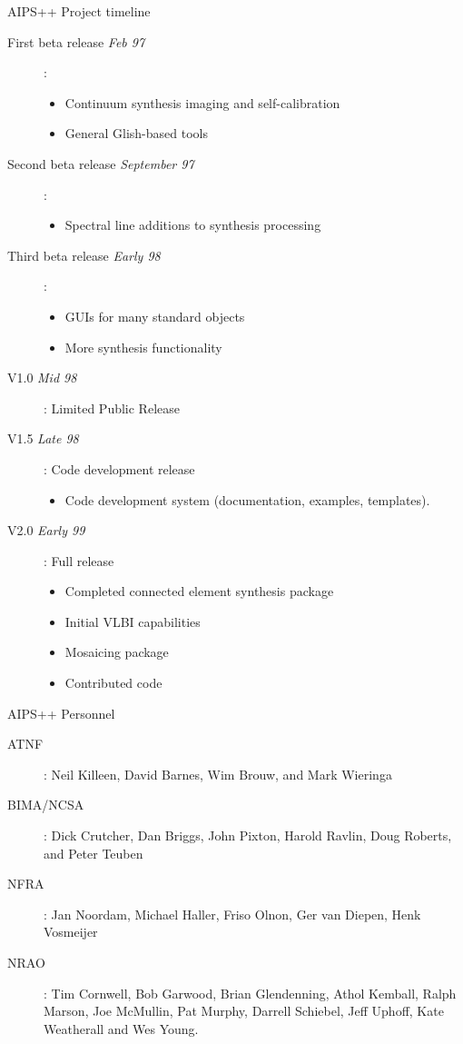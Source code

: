 \documentclass[11pt]{article}
\begin{document}
\begin{slide}{AIPS++ Project timeline}
\begin{description}
\item[First beta release {\em Feb 97}]:
\begin{itemize}
\item Continuum synthesis imaging and self-calibration
\item General Glish-based tools
\end{itemize}
\item[Second beta release {\em September 97}]:
\begin{itemize}
\item Spectral line additions to synthesis processing
\end{itemize}
\item[Third beta release {\em Early 98}]:
\begin{itemize}
\item GUIs for many standard objects
\item More synthesis functionality
\end{itemize}
\item[V1.0 {\em Mid 98}]: Limited Public Release
\item[V1.5 {\em Late 98}]: Code development release
\begin{itemize}
\item Code development system (documentation, examples, templates). 
\end{itemize}
\item[V2.0 {\em Early 99}]: Full release
\begin{itemize}
\item Completed connected element synthesis package
\item Initial VLBI capabilities
\item Mosaicing package
\item Contributed code
\end{itemize}
\end{description}
\end{slide}

\begin{slide}{AIPS++ Personnel}
\begin{description}
\item[ATNF]: Neil Killeen, David Barnes, Wim Brouw, and Mark
Wieringa

\item[BIMA/NCSA]: Dick Crutcher, Dan Briggs, John Pixton,
Harold Ravlin, Doug Roberts, and Peter Teuben

\item[NFRA]:  Jan Noordam, Michael Haller, Friso Olnon, 
Ger van Diepen, Henk Vosmeijer

\item[NRAO]: Tim Cornwell, Bob Garwood, Brian
Glendenning, Athol Kemball, Ralph Marson, Joe McMullin, Pat Murphy,
Darrell Schiebel, Jeff Uphoff, Kate Weatherall and Wes Young.

\end{description}
\end{slide}
\end{document}
